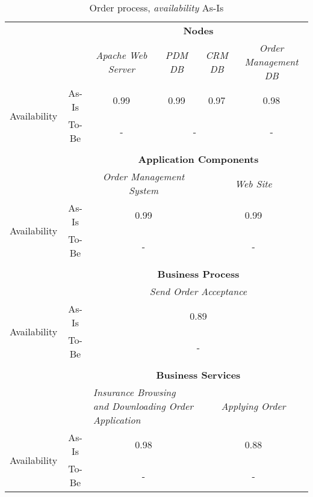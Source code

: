 \begin{table}[H]
	\centering
	\begin{tabular}{|c|c|p{2cm}|p{2.5cm}|p{2.5cm}|p{2.5cm}|}
		\cline{3-6}

		\multicolumn{2}{c}{} & \multicolumn{4}{|c|}{\textbf{Nodes}} \\ \cline{3-6}
		\multicolumn{2}{c|}{} & \multicolumn{1}{c|}{\textsl{Apache Web Server}} & \multicolumn{1}{c|}{\textsl{PDM DB}} & \multicolumn{1}{c|}{\textsl{CRM DB}} & \multicolumn{1}{c|}{\textsl{Order Management DB}}\\
		\hline
		\multirow{2}{*}{Availability} & As-Is & \multicolumn{1}{c|}{0.99} & \multicolumn{1}{c|}{0.99} & \multicolumn{1}{c|}{0.97} & \multicolumn{1}{c|}{0.98}\\ \cline{2-6}
										& To-Be &\multicolumn{1}{c|}{-} & \multicolumn{2}{c|}{-} & \multicolumn{1}{c|}{-}\\ \hline

		\multicolumn{6}{c}{} \\ \cline{3-6}							
		\multicolumn{2}{c}{} & \multicolumn{4}{|c|}{\textbf{Application Components}} \\ \cline{3-6}
		\multicolumn{2}{c|}{} & \multicolumn{2}{c|}{\textsl{Order Management System}} & \multicolumn{2}{c|}{\textsl{Web Site}}\\
		\hline
		\multirow{2}{*}{Availability} & As-Is & \multicolumn{2}{c|}{0.99} & \multicolumn{2}{c|}{0.99}\\ \cline{2-6}
										& To-Be &\multicolumn{2}{c|}{-} & \multicolumn{2}{c|}{-}\\ \hline

		\multicolumn{6}{c}{} \\ \cline{3-6}
		\multicolumn{2}{c}{} & \multicolumn{4}{|c|}{\textbf{Business Process}} \\ \cline{3-6}
		\multicolumn{2}{c|}{} & \multicolumn{4}{|c|}{\textsl{Send Order Acceptance}}\\ \hline
		\multirow{2}{*}{Availability} & As-Is & \multicolumn{4}{|c|}{0.89}\\ \cline{2-6}
									   & To-Be & \multicolumn{4}{|c|}{-}\\ \hline
		\multicolumn{6}{c}{} \\ \cline{3-6}
		\multicolumn{2}{c}{} & \multicolumn{4}{|c|}{\textbf{Business Services}} \\ \cline{3-6}

		\multicolumn{2}{c|}{} & \multicolumn{2}{|p{5cm}|}{\textsl{Insurance Browsing and Downloading Order Application}} & \multicolumn{2}{|c|}{\textsl{Applying Order}} \\ \hline
		\multirow{2}{*}{Availability} & As-Is & \multicolumn{2}{|c|}{0.98} & \multicolumn{2}{|c|}{0.88}\\ \cline{2-6}
									   & To-Be & \multicolumn{2}{|c|}{-} & \multicolumn{2}{|c|}{-}\\ \hline
	\end{tabular}
\caption{Order process, \textsl{availability} As-Is} 
\label{tab:order_as_is}
\end{table}